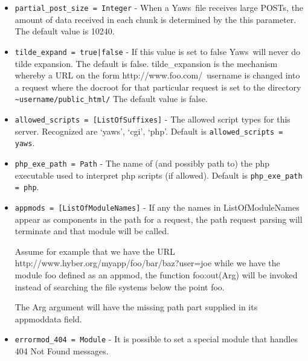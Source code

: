 \documentclass[11pt,oneside,english]{book}
\newcommand{\Yaws}            %
        {{\sc Yaws}}
\begin{document}
\begin{itemize}
\item       \verb+partial_post_size = Integer+ -
              When a \Yaws\  file receives large  POSTs,  the
              amount  of  data  received  in each chunk is
              determined by the this parameter.  The default
              value is 10240.

\item       \verb+tilde_expand = true|false+ -
              If  this  value  is  set  to false \Yaws\  will
              never do tilde  expansion.  The  default  is
              false.   tilde\_expansion   is  the  mechanism
              whereby    a     URL     on     the     form
              http://www.foo.com/~username is changed into
              a request where the docroot for that particular
           request is set to the directory
              \verb+~user­name/public_html/+ The default value is false.

\item       \verb+allowed_scripts = [ListOfSuffixes]+ -
              The allowed script types for this server.  Recognized
              are `yaws', `cgi', `php'.  Default is
              \verb+allowed_scripts = yaws+.

\item       \verb+php_exe_path = Path+ -
              The name of (and possibly path to) the php executable
	      used to interpret php scripts (if allowed).  Default is
	      \verb+php_exe_path = php+.

\item       \verb+appmods = [ListOfModuleNames]+ -
              If any the names in ListOfModuleNames appear
              as components in the path for a request, the
              path request parsing will terminate and that
              module will be called.

              Assume for example  that  we  have  the  URL
              http://www.hyber.org/myapp/foo/bar/baz?user=joe
              while we have the module foo defined  as  an
              appmod,  the  function  foo:out(Arg) will be
              invoked instead of searching the file systems
              below the point foo.

              The  Arg argument will have the missing path
              part supplied in its appmoddata field.

\item     \verb+errormod_404 = Module+ -
              It is possible to set a special module  that
              handles 404 Not Found messages.


\end{itemize}
\end{document}

